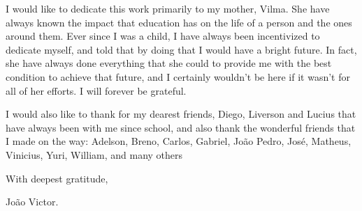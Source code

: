 
I would like to dedicate this work primarily to my mother, Vilma. She have always known the impact that education has on the life of a person and the ones around them. Ever since I was a child, I have always been incentivized to dedicate myself, and told that by doing that I would have a bright future. In fact, she have always done everything that she could to provide me with the best condition to achieve that future, and I certainly wouldn't be here if it wasn't for all of her efforts. I will forever be grateful.

I would also like to thank for my dearest friends, Diego, Liverson and Lucius that have always been with me since school, and also thank the wonderful friends that I made on the way: Adelson, Breno, Carlos, Gabriel, João Pedro, José, Matheus, Vinicius, Yuri, William, and many others

With deepest gratitude, 

João Victor.